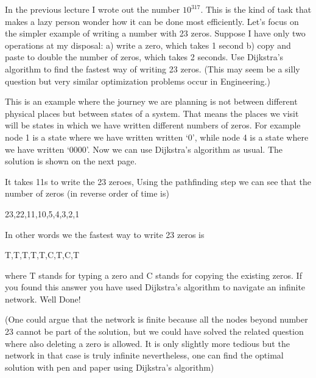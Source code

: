 
In the previous lecture I wrote out the number $10^{317}$. This is the kind of task that makes a lazy person wonder how it can be done most efficiently.
Let's focus on the simpler example of writing a number with 23 zeros. Suppose I have only two operations at my disposal: a) write a zero, which takes 1 second b) copy and paste to double the number of zeros, which takes 2 seconds. Use Dijkstra's algorithm to find the fastest way of writing 23 zeros. (This may seem be a silly question but very similar optimization problems occur in Engineering.) 

\solution
This is an  example where the journey we are planning is not between different physical places but between states of a system. That means the places we visit will be states in which we have written different numbers of zeros. For example node 1 is a state where we have written written `0', while node 4 is a state where we have written `0000'. Now we can use Dijkstra's algorithm as usual. The solution is shown on the next page.

It takes 11s to write the 23 zeroes, Using the pathfinding step we can see that the number of zeros (in reverse order of time is)
\begin{center}
23,22,11,10,5,4,3,2,1 
\end{center}
In other words we the fastest way to write 23 zeros is
\begin{center}
T,T,T,T,T,C,T,C,T
\end{center}
where T stands for typing a zero and C stands for copying the existing zeros. If you found this answer you have used Dijkstra's algorithm to navigate an infinite network. Well Done! 

(One could argue that the network is finite because all the nodes beyond number 23 cannot be part of the solution, but we could have solved the related question where also deleting a zero is allowed. It is only slightly more tedious but the network in that case is truly infinite nevertheless, one can find the optimal solution with pen and paper using Dijkstra's algorithm)

